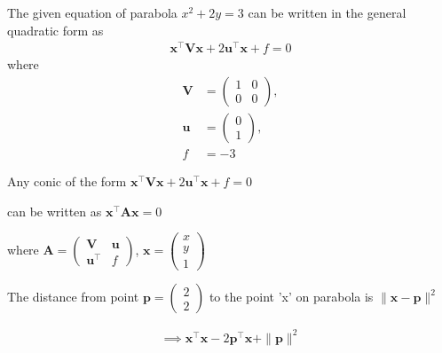 \documentclass[journal,10pt,twocolumn]{article}
\let\vec\mathbf
\newcommand{\myvec}[1]{\ensuremath{\begin{pmatrix}#1\end{pmatrix}}}
\begin{document}
The given equation of parabola $x^2+2y=3$ can be written in the general quadratic form as
\begin{align}
    \label{eq:conic_quad_form}
    \vec{x}^{\top}\vec{V}\vec{x}+2\vec{u}^{\top}\vec{x}+f=0
    \end{align}
where
\begin{align}
	\label{eq:V_matrix}
	\vec{V} &= \myvec{1 & 0\\0 & 0},
	\\
	\label{eq:u_vector}
	\vec{u} &= \myvec{0\\1},
	\\
	\label{eq:f_value}
	f &=-3
\end{align}
\begin{center}
 Any conic of the form  $\vec{x^{\top}}\vec{V}\vec{x} + 2\vec{u^{\top}}\vec{x} + f = 0$ \end{center}
\begin{center} can be written as $\vec{x^{\top}}\vec{A}\vec{x} = 0$\end{center} 
\begin{center}
where $\vec{A} = \myvec{\vec{V}&\vec{u}\\\vec{u^{\top}}&f}$, $\vec{x} =\myvec{x\\y\\1}$
\end{center}
\begin{center}
The distance from point $\vec{p} = \myvec{2\\2}$ to the point 'x' on parabola is $\|\vec{x}-\vec{p}\|^2$
\end{center}

\begin{gather*}
	\implies \vec{x^{\top}}\vec{x} - 2\vec{p^{\top}}\vec{x} + \|\vec{p}\|^2
\end{gather*}
\end{document}
